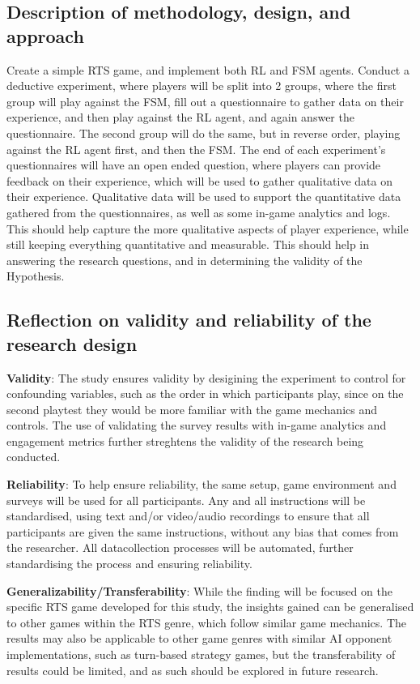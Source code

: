 \documentclass[conference]{IEEEtran}
\begin{document}
\subsection{Description of methodology, design, and approach}

Create a simple RTS game, and implement both RL and FSM agents. Conduct a deductive experiment, where players will be split into 2 groups,
where the first group will play against the FSM, fill out a questionnaire to gather data on their experience, and then play against the RL agent,
and again answer the questionnaire. The second group will do the same, but in reverse order, playing against the RL agent first, and then the FSM.
The end of each experiment's questionnaires will have an open ended question, where players can provide feedback on their experience,
which will be used to gather qualitative data on their experience. Qualitative data will be used to support the quantitative data gathered from
the questionnaires, as well as some in-game analytics and logs. This should help capture the more qualitative aspects of player experience,
while still keeping everything quantitative and measurable. This should help in answering the research questions, and in determining the validity
of the Hypothesis.

\subsection{Reflection on validity and reliability of the research design}

\textbf{Validity}: The study ensures validity by desigining the experiment to control for confounding variables, such as the order in which participants play, since on the second playtest they would be more
familiar with the game mechanics and controls. The use of validating the survey results with in-game analytics and engagement metrics further streghtens the validity of the research being conducted.

\textbf{Reliability}: To help ensure reliability, the same setup, game environment and surveys will be used for all participants. Any and all instructions will be standardised, using text and/or video/audio
recordings to ensure that all participants are given the same instructions, without any bias that comes from the researcher. All datacollection processes will be automated, further standardising the process
and ensuring reliability.

\textbf{Generalizability/Transferability}: While the finding will be focused on the specific RTS game developed for this study, the insights gained can be generalised to other games within the RTS genre,
which follow similar game mechanics. The results may also be applicable to other game genres with similar AI opponent implementations, such as turn-based strategy games, but the transferability
of results could be limited, and as such should be explored in future research.
\end{document}
